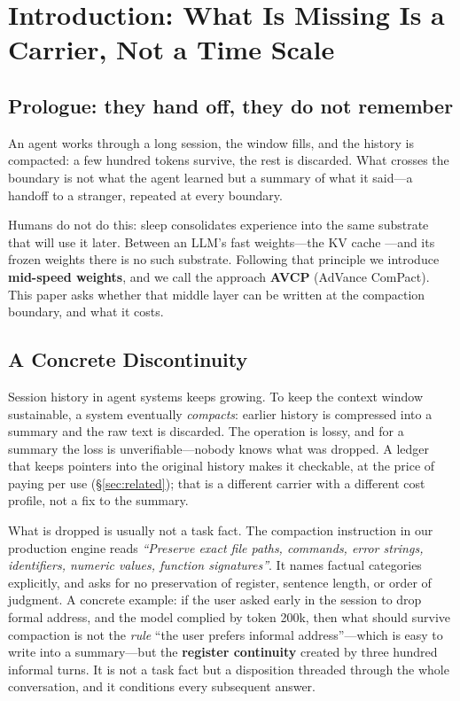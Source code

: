 \documentclass[sigconf,nonacm]{acmart}
\begin{document}

\maketitle

\section{Introduction: What Is Missing Is a Carrier, Not a Time Scale}

\subsection*{Prologue: they hand off, they do not remember}

An agent works through a long session, the window fills, and the history is compacted: a few hundred
tokens survive, the rest is discarded. What crosses the boundary is not what the agent learned but a
summary of what it said---a handoff to a stranger, repeated at every boundary.

Humans do not do this: sleep consolidates experience into the same substrate that will use it later. Between
an LLM's fast weights---the KV cache \cite{mita2026,schlag2021}---and its frozen weights there is no such
substrate. Following that principle we introduce \textbf{mid-speed weights}, and we call the approach
\textbf{AVCP} (AdVance ComPact). This paper asks whether that middle layer can be written at the compaction
boundary, and what it costs.

\subsection{A Concrete Discontinuity}
Session history in agent systems keeps growing. To keep the context window sustainable, a system
eventually \emph{compacts}: earlier history is compressed into a summary and the raw text is discarded.
The operation is lossy, and for a summary the loss is unverifiable---nobody knows what was dropped. A
ledger that keeps pointers into the original history makes it checkable, at the price of paying per use
(\S\ref{sec:related}); that is a different carrier with a different cost profile, not a fix to the summary.

What is dropped is usually not a task fact. The compaction instruction in our production engine reads
\emph{``Preserve exact file paths, commands, error strings, identifiers, numeric values, function
signatures''}. It names factual categories explicitly, and asks for no preservation of register, sentence
length, or order of judgment. A concrete example: if the user asked early in the session to drop formal
address, and the model complied by token 200k, then what should survive compaction is not the
\emph{rule} ``the user prefers informal address''---which is easy to write into a summary---but the
\textbf{register continuity} created by three hundred informal turns. It is not a task fact but a
disposition threaded through the whole conversation, and it conditions every subsequent answer.
\end{document}
